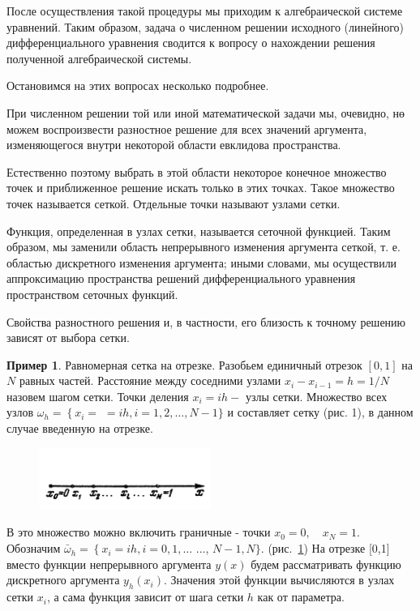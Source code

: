 После осуществления такой процедуры мы приходим к алгебраической системе уравнений. Таким образом, задача о численном решении исходного (линейного) дифференциального уравнения сводится к вопросу о нахождении решения полученной алгебраической системы.

Остановимся на этих вопросах несколько подробнее.

При численном решении той или иной математической задачи мы, очевидно, нө можем воспроизвести разностное решение для всех значений аргумента, изменяющегося внутри некоторой области евклидова пространства.

Естественно поэтому выбрать в этой области некоторое конечное множество точек и приближенное решение искать только в этих точках. Такое множество точек называется сеткой. Отдельные точки называют узлами сетки.

Функция, определенная в узлах сетки, называется сеточной функцией. Таким образом, мы заменили область непрерывного изменения аргумента сеткой, т. е. областью дискретного изменения аргумента; иными словами, мы осуществили аппроксимацию пространства решений дифференциального уравнения пространством сеточных функций.

Свойства разностного решения и, в частности, его близость к точному решению зависят от выбора сетки.

\textbf{Пример 1}. Равномерная сетка на отрезке. Разобьем единичный отрезок $[0,1]$ на $N$ равных частей. Расстояние между соседними узлами $x_i-x_{i-1}=h=1 / N$ назовем шагом сетки. Точки деления $x_i=i h-$ узлы сетки. Множество всех узлов $\omega_h=\left\{x_i=\right.$ $=i h, i=1,2, \ldots, N-1\}$ и составляет сетку (рис. 1), в данном случае введенную на отрезке.

\begin{figure}
	\centering
	\includegraphics[width=0.5\textwidth]{img/1.png}
	\caption{}
	\label{fig:1}
\end{figure}


В это множество можно включить граничные - точки $x_0=0, \quad x_N=1$. Обозначим $\bar{\omega}_h=\left\{x_i=i h, i=0,1, \ldots\right.$ ..., $N-1, N\}$.
(рис.~\ref{fig:1}) 
На отрезке [0,1] вместо функции непрерывного аргумента $y(x)$ будем рассматривать функцию дискретного аргумента $y_h\left(x_i\right)$. Значения этой функции вычисляются в узлах сетки $x_i$, а сама функция зависит от шага сетки $h$ как от параметра.

